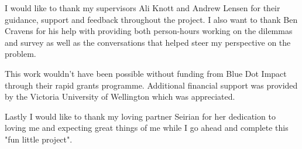 I would like to thank my supervisors Ali Knott and Andrew Lensen for their guidance, support and feedback throughout the project. I also want to thank Ben Cravens for his help with providing both person-hours working on the dilemmas and survey as well as the conversations that helped steer my perspective on the problem.

This work wouldn't have been possible without funding from Blue Dot Impact through their rapid grants programme. Additional financial support was provided by the Victoria University of Wellington which was appreciated.

Lastly I would like to thank my loving partner Seirian for her dedication to loving me and expecting great things of me while I go ahead and complete this "fun little project".